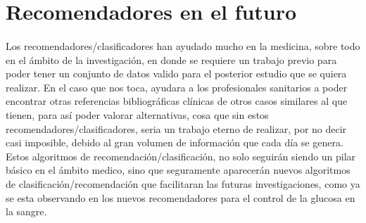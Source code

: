 \newpage
\section{Recomendadores en el futuro}

\paragraph{}
Los recomendadores/clasificadores han ayudado mucho en la medicina, sobre todo en el ámbito de la investigación, en donde se requiere un trabajo previo para poder tener un conjunto de datos valido para el posterior estudio que se quiera realizar. En el caso que nos toca, ayudara a los profesionales sanitarios a poder encontrar otras referencias bibliográficas clínicas de otros casos similares al que tienen, para así poder valorar alternativas, cosa que sin estos recomendadores/clasificadores, seria un trabajo eterno de realizar, por no decir casi imposible, debido al gran volumen de información que cada día se genera. Estos algoritmos de recomendación/clasificación, no solo seguirán siendo un pilar básico en el ámbito medico, sino que seguramente aparecerán nuevos algoritmos de clasificación/recomendación que facilitaran las futuras investigaciones, como ya se esta observando en los nuevos recomendadores para el control de la glucosa en la sangre\cite{ref:refer_diabetes_control}.
